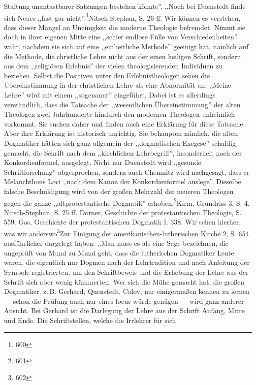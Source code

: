 Staltung unantastbarer Satzungen bestehen könnte''. ,,Noch bei Duenstedt finde sich Neues ,,fast gar nicht''.\footnote{600}{Nitsch-Stephan, S. 26 ff.} Wir können es verstehen, dass dieser Mangel an Uneinigkeit die moderne Theologie befremdet. Nimmt sie doch in ihrer eigenen Mitte eine ,,schier endlose Fülle von Verschiedenheiten'' wahr, nachdem sie sich auf eine ,,einheitliche Methode'' geeinigt hat, nämlich auf die Methode, die christliche Lehre nicht aus der einen heiligen Schrift, sondern aus dem ,,religiösen Erlebnis'' der vielen theologisierenden Individuen zu beziehen. Selbst die Positiven unter den Erlebnistheologen sehen die Übereinstimmung in der christlichen Lehre als eine Abnormität an. ,,Meine Lehre'' wird mit einem ,,sogenannt'' eingeführt. Dabei ist es allerdings verständlich, dass die Tatsache der ,,wesentlichen Übereinstimmung'' der alten Theologen zwei Jahrhunderte hindurch den modernen Theologen unheimlich vorkommt. Sie suchen daher und finden auch eine Erklärung für diese Tatsache. Aber ihre Erklärung ist historisch unrichtig. Sie behaupten nämlich, die alten Dogmatiker hätten sich ganz allgemein der ,,dogmatischen Exegese'' schuldig gemacht, die Schrift nach dem ,,kirchlichen Lehrbegriff'', insonderheit nach der Konkordienformel, ausgelegt. Nicht nur Duenstedt wird ,,gesunde Schriftforschung'' abgesprochen, sondern auch Chemnitz wird nachgesagt, dass er Melanchthons Loci ,,nach dem Kanon der Konkordienformel auslege''. Dieselbe falsche Beschuldigung wird von der großen Mehrzahl der neueren Theologen gegen die ganze ,,altprotestantische Dogmatik'' erhoben.\footnote{601}{Kirm, Grundriss 3, S. 4. Nitsch-Stephan, S. 25 ff. Dorner, Geschichte der protestantischen Theologie, S. 559. Gas, Geschichte der protestantischen Dogmatik I. 338.} Wir sehen hierher, was wir anderswo\footnote{602}{Zur Einigung der amerikanischen-lutherischen Kirche 2, S. 654.} ausführlicher dargelegt haben: ,,Man muss es als eine Sage bezeichnen, die ungeprüft von Mund zu Mund geht, dass die lutherischen Dogmatiker Leute waren, die eigentlich nur Dogmen nach der Lehrtradition und nach Anleitung der Symbole registrierten, um den Schriftbeweis und die Erhebung der Lehre aus der Schrift sich aber wenig kümmerten. Wer sich die Mühe gemacht hat, die großen Dogmatiker, z.\,B. Gerhard, Quenstedt, Calov, nur einigermaßen kennen zu lernen --- schon die Prüfung auch nur eines locus würde genügen --- wird ganz anderer Ansicht. Bei Gerhard ist die Darlegung der Lehre aus der Schrift Anfang, Mitte und Ende. Die Schriftstellen, welche die Irrlehrer für sich